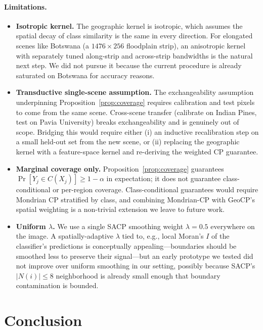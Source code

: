 \documentclass[11pt]{article}
\newcommand{\1}{\mathbf{1}}
\begin{document}
\paragraph{Limitations.}
\begin{itemize}[topsep=2pt,itemsep=2pt,leftmargin=1.5em]
    \item \textbf{Isotropic kernel.} The geographic kernel is isotropic, which assumes the spatial decay of class similarity is the same in every direction. For elongated scenes like Botswana (a $1476 \times 256$ floodplain strip), an anisotropic kernel with separately tuned along-strip and across-strip bandwidths is the natural next step. We did not pursue it because the current procedure is already saturated on Botswana for accuracy reasons.
    \item \textbf{Transductive single-scene assumption.} The exchangeability assumption underpinning Proposition~\ref{prop:coverage} requires calibration and test pixels to come from the same scene. Cross-scene transfer (calibrate on Indian Pines, test on Pavia University) breaks exchangeability and is genuinely out of scope. Bridging this would require either (i) an inductive recalibration step on a small held-out set from the new scene, or (ii) replacing the geographic kernel with a feature-space kernel and re-deriving the weighted CP guarantee.
    \item \textbf{Marginal coverage only.} Proposition~\ref{prop:coverage} guarantees $\Pr[Y_j \in C(X_j)] \ge 1 - \alpha$ in expectation; it does not guarantee class-conditional or per-region coverage. Class-conditional guarantees would require Mondrian CP stratified by class, and combining Mondrian-CP with GeoCP's spatial weighting is a non-trivial extension we leave to future work.
    \item \textbf{Uniform $\lambda$.} We use a single SACP smoothing weight $\lambda = 0.5$ everywhere on the image. A spatially-adaptive $\lambda$ tied to, e.g., local Moran's $I$ of the classifier's predictions is conceptually appealing---boundaries should be smoothed less to preserve their signal---but an early prototype we tested did not improve over uniform smoothing in our setting, possibly because SACP's $|N(i)| \le 8$ neighborhood is already small enough that boundary contamination is bounded.
\end{itemize}

\section{Conclusion}
\end{document}
